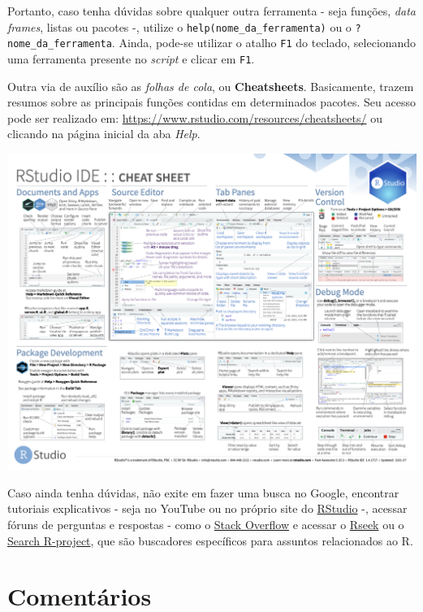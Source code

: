 \documentclass[
  brazilian,
]{book}
\let\origfigure\figure
\let\endorigfigure\endfigure
\renewenvironment{figure}[1][2] {
    \expandafter\origfigure\expandafter[H]
} {
    \endorigfigure
}
\begin{document}
Portanto, caso tenha dúvidas sobre qualquer outra ferramenta - seja funções, \emph{data frames}, listas ou pacotes -, utilize o \texttt{help(nome\_da\_ferramenta)} ou o \texttt{?nome\_da\_ferramenta}. Ainda, pode-se utilizar o atalho \texttt{F1} do teclado, selecionando uma ferramenta presente no \emph{script} e clicar em \texttt{F1}.

Outra via de auxílio são as \emph{folhas de cola}, ou \textbf{Cheatsheets}. Basicamente, trazem resumos sobre as principais funções contidas em determinados pacotes. Seu acesso pode ser realizado em: \url{https://www.rstudio.com/resources/cheatsheets/} ou clicando na página inicial da aba \emph{Help}.

\begin{figure}

{\centering \includegraphics[width=0.7\linewidth]{imagens/rstudio_cheet} 

}

\caption{Cheetsheet do RStudio. Nela podemos verificar, de maneira geral, as principais funcionalidades presentes no ambiente do RStudio.}\label{fig:unnamed-chunk-9}
\end{figure}

Caso ainda tenha dúvidas, não exite em fazer uma busca no Google, encontrar tutoriais explicativos - seja no YouTube ou no próprio site do \href{https://www.rstudio.com/resources/webinars/}{RStudio} -, acessar fóruns de perguntas e respostas - como o \href{https://stackoverflow.com/}{Stack Overflow} e acessar o \href{https://rseek.org/}{Rseek} ou o \href{https://search.r-project.org/}{Search R-project}, que são buscadores específicos para assuntos relacionados ao R.

\hypertarget{comentuxe1rios}{%
\section{Comentários}\label{comentuxe1rios}}
\end{document}
